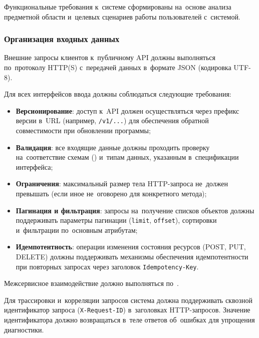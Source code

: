 \documentclass[12pt,a4paper]{extarticle}
\begin{document}
Функциональные требования к~системе сформированы на~основе анализа предметной области и~целевых сценариев работы пользователей с~системой.

\subsubsection{Организация входных данных}
\label{sec:input_data}

\begin{hseExample}
Внешние запросы клиентов к~публичному API должны выполняться по~протоколу HTTP(S) с~передачей данных в~формате JSON (кодировка UTF-8).

Для всех интерфейсов ввода должны соблюдаться следующие требования:
\begin{itemize}[nosep, leftmargin=1.25cm]
    \item \textbf{Версионирование}: доступ к~API должен осуществляться через префикс версии в~URL (например, \texttt{/v1/...}) для обеспечения обратной совместимости при обновлении программы;
    \item \textbf{Валидация}: все входящие данные должны проходить проверку на~соответствие схемам () и~типам данных, указанным в~спецификации интерфейса;
    \item \textbf{Ограничения}: максимальный размер тела HTTP-запроса не~должен превышать  (если иное не~оговорено для конкретного метода);
    \item \textbf{Пагинация и фильтрация}: запросы на~получение списков объектов должны поддерживать параметры пагинации (\texttt{limit}, \texttt{offset}), сортировки и~фильтрации по~основным атрибутам;
    \item \textbf{Идемпотентность}: операции изменения состояния ресурсов (POST, PUT, DELETE) должны поддерживать механизмы обеспечения идемпотентности при повторных запросах через заголовок \texttt{Idempotency-Key}.
\end{itemize}

Межсервисное взаимодействие должно выполняться по~.

Для трассировки и~корреляции запросов система должна поддерживать сквозной идентификатор запроса (\texttt{X-Request-ID}) в~заголовках HTTP-запросов. Значение идентификатора должно возвращаться в~теле ответов об~ошибках для упрощения диагностики.
\end{hseExample}
\end{document}
